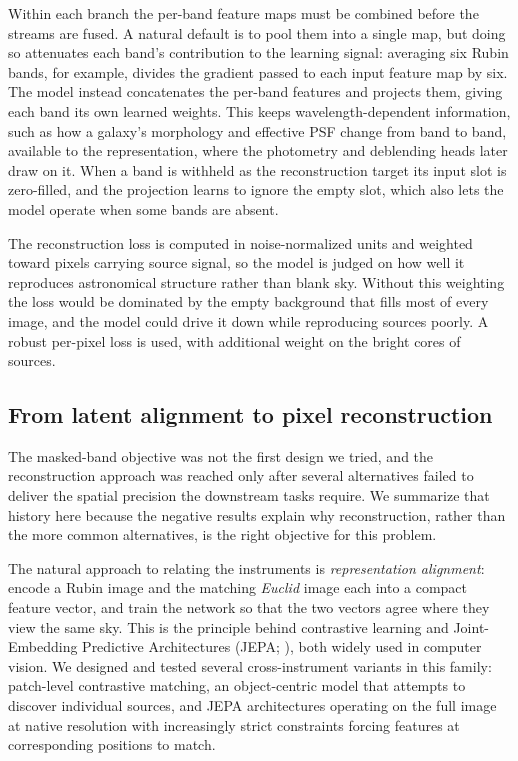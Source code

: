 \documentclass[twocolumn,linenumbers]{aastex701}
\begin{document}
Within each branch the per-band feature maps must be combined before the streams are fused. A natural default is to pool them into a single map, but doing so attenuates each band's contribution to the learning signal: averaging six Rubin bands, for example, divides the gradient passed to each input feature map by six. The model instead concatenates the per-band features and projects them, giving each band its own learned weights. This keeps wavelength-dependent information, such as how a galaxy's morphology and effective PSF change from band to band, available to the representation, where the photometry and deblending heads later draw on it. When a band is withheld as the reconstruction target its input slot is zero-filled, and the projection learns to ignore the empty slot, which also lets the model operate when some bands are absent.

The reconstruction loss is computed in noise-normalized units and weighted toward pixels carrying source signal, so the model is judged on how well it reproduces astronomical structure rather than blank sky. Without this weighting the loss would be dominated by the empty background that fills most of every image, and the model could drive it down while reproducing sources poorly. A robust per-pixel loss is used, with additional weight on the bright cores of sources.

\subsection{From latent alignment to pixel reconstruction}

The masked-band objective was not the first design we tried, and the reconstruction approach was reached only after several alternatives failed to deliver the spatial precision the downstream tasks require. We summarize that history here because the negative results explain why reconstruction, rather than the more common alternatives, is the right objective for this problem.

The natural approach to relating the instruments is \emph{representation alignment}: encode a Rubin image and the matching \textit{Euclid} image each into a compact feature vector, and train the network so that the two vectors agree where they view the same sky. This is the principle behind contrastive learning \citep{contrastive} and Joint-Embedding Predictive Architectures (JEPA; \citealt{JEPA}), both widely used in computer vision. We designed and tested several cross-instrument variants in this family: patch-level contrastive matching, an object-centric model that attempts to discover individual sources, and JEPA architectures operating on the full image at native resolution with increasingly strict constraints forcing features at corresponding positions to match.
\end{document}
